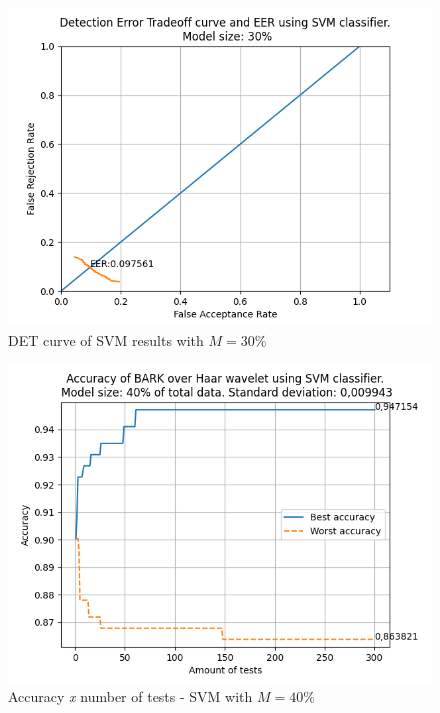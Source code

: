 \begin{figure}[H]
\centering
\includegraphics[scale=.6]{images/results/det/DET_SVM_30}
\caption{DET curve of SVM results with $M=30\%$}
\label{fig:detsvm30}
\end{figure}
\begin{figure}[H]
\centering
\includegraphics[scale=.6]{images/results/confusionMatrices/classifier_SVM_40.png}
\caption{Accuracy \textit{x} number of tests - SVM with $M=40\%$}
\label{fig:classifiersvm40}
\end{figure}
